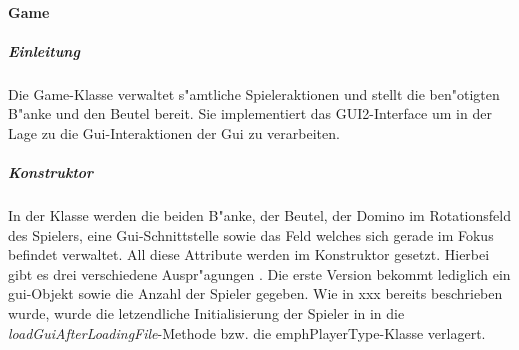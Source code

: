 \paragraph{Game}
\label{par:game}

\subparagraph{Einleitung}
Die Game-Klasse verwaltet s"amtliche Spieleraktionen und stellt die ben"otigten B"anke und den Beutel bereit. Sie implementiert das GUI2-Interface um in der Lage zu die Gui-Interaktionen der Gui zu verarbeiten. 

\subparagraph{Konstruktor}
In der Klasse werden die beiden B"anke, der Beutel, der Domino im Rotationsfeld des Spielers, eine Gui-Schnittstelle sowie das Feld welches sich gerade im Fokus befindet verwaltet. All diese Attribute werden im Konstruktor gesetzt. Hierbei gibt es drei verschiedene Auspr"agungen . Die erste Version bekommt lediglich ein gui-Objekt sowie die Anzahl der Spieler gegeben. Wie in 
xxx bereits beschrieben wurde, wurde die letzendliche Initialisierung der Spieler in in die \emph{loadGuiAfterLoadingFile}-Methode bzw. die emph{PlayerType}-Klasse verlagert. 

